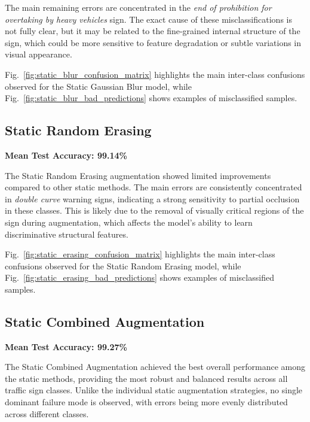 \documentclass[conference]{IEEEtran}
\begin{document}
The main remaining errors are concentrated in the \textit{end of prohibition for overtaking by heavy vehicles} sign. The exact cause of these misclassifications is not fully clear, but it may be related to the fine-grained internal structure of the sign, which could be more sensitive to feature degradation or subtle variations in visual appearance.

Fig.~\ref{fig:static_blur_confusion_matrix} highlights the main inter-class confusions observed for the Static Gaussian Blur model, while Fig.~\ref{fig:static_blur_bad_predictions} shows examples of misclassified samples.







\subsection{Static Random Erasing}

\textbf{Mean Test Accuracy: 99.14\%}

The Static Random Erasing augmentation showed limited improvements compared to other static methods. The main errors are consistently concentrated in \textit{double curve} warning signs, indicating a strong sensitivity to partial occlusion in these classes. This is likely due to the removal of visually critical regions of the sign during augmentation, which affects the model’s ability to learn discriminative structural features.

Fig.~\ref{fig:static_erasing_confusion_matrix} highlights the main inter-class confusions observed for the Static Random Erasing model, while Fig.~\ref{fig:static_erasing_bad_predictions} shows examples of misclassified samples.





\subsection{Static Combined Augmentation}

\textbf{Mean Test Accuracy: 99.27\%}

The Static Combined Augmentation achieved the best overall performance among the static methods, providing the most robust and balanced results across all traffic sign classes. Unlike the individual static augmentation strategies, no single dominant failure mode is observed, with errors being more evenly distributed across different classes.
\end{document}
